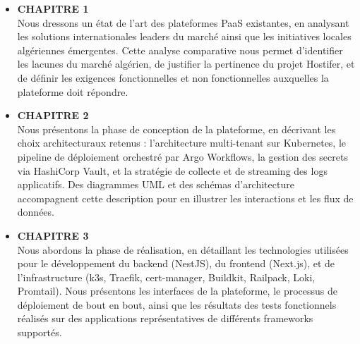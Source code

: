 \begin{itemize}
    \item \textbf{\uppercase{Chapitre 1}} \\
    Nous dressons un état de l'art des plateformes PaaS existantes, en analysant les solutions
    internationales leaders du marché ainsi que les initiatives locales algériennes émergentes.
    Cette analyse comparative nous permet d'identifier les lacunes du marché algérien, de
    justifier la pertinence du projet Hostifer, et de définir les exigences fonctionnelles et
    non fonctionnelles auxquelles la plateforme doit répondre.

    \item \textbf{\uppercase{Chapitre 2}} \\
    Nous présentons la phase de conception de la plateforme, en décrivant les choix
    architecturaux retenus : l'architecture multi-tenant sur Kubernetes, le pipeline de
    déploiement orchestré par Argo Workflows, la gestion des secrets via HashiCorp Vault,
    et la stratégie de collecte et de streaming des logs applicatifs. Des diagrammes UML
    et des schémas d'architecture accompagnent cette description pour en illustrer
    les interactions et les flux de données.

    \item \textbf{\uppercase{Chapitre 3}} \\
    Nous abordons la phase de réalisation, en détaillant les technologies utilisées pour
    le développement du backend (NestJS), du frontend (Next.js), et de l'infrastructure
    (k3s, Traefik, cert-manager, Buildkit, Railpack, Loki, Promtail). Nous présentons
    les interfaces de la plateforme, le processus de déploiement de bout en bout, ainsi
    que les résultats des tests fonctionnels réalisés sur des applications représentatives
    de différents frameworks supportés.
\end{itemize}